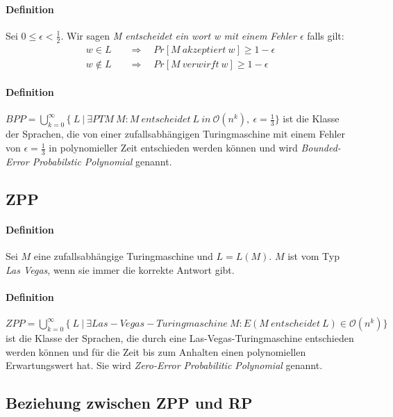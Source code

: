\paragraph{Definition}
Sei $0 \leq \epsilon < \frac{1}{2}$. Wir sagen \emph{M entscheidet ein wort w mit einem Fehler $\epsilon$} falls gilt:
\begin{align*}
	w \in L \quad & \Rightarrow \quad Pr[M\ akzeptiert\ w] \geq 1 - \epsilon \\
	w \notin L \quad & \Rightarrow \quad Pr[M\ verwirft\ w] \geq 1 - \epsilon
\end{align*}

\paragraph{Definition}
$BPP = \bigcup\limits_{k=0}^{\infty} \bigl\{\ L\ \bigl\lvert\ \exists PTM\ M : M\ entscheidet\ L\ in\ \mathcal{O}(n^k),\ \epsilon =  \frac{1}{3} \bigl\}$ ist die Klasse der Sprachen, die von einer zufallsabhängigen Turingmaschine mit einem Fehler von $\epsilon = \frac{1}{3}$ in polynomieller Zeit entschieden werden können und wird \emph{Bounded-Error Probabilstic Polynomial} genannt.


\subsection{ZPP}
\paragraph{Definition}
Sei $M$ eine zufallsabhängige Turingmaschine und $L = L(M)$. $M$ ist vom Typ \emph{Las Vegas}, wenn sie immer die korrekte Antwort gibt.

\paragraph{Definition}
$ZPP = \bigcup\limits_{k=0}^{\infty} \bigl\{\ L\ \bigl\lvert\ \exists Las-Vegas-Turingmaschine\ M : E(M\ entscheidet\ L) \in \mathcal{O}(n^k) \bigl\}$ ist die Klasse der Sprachen, die durch eine Las-Vegas-Turingmaschine entschieden werden können und für die Zeit bis zum Anhalten einen polynomiellen Erwartungswert hat. 
Sie wird \emph{Zero-Error Probabilitic Polynomial} genannt.


\subsection{Beziehung zwischen ZPP und RP}
